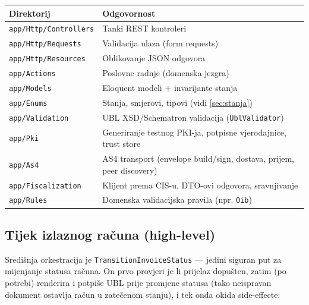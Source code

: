 \documentclass[11pt,a4paper]{article}
\begin{document}
\begin{tabularx}{\textwidth}{@{}lY@{}}
\toprule
\textbf{Direktorij} & \textbf{Odgovornost} \\
\midrule
\texttt{app/Http/Controllers} & Tanki REST kontroleri \\
\texttt{app/Http/Requests} & Validacija ulaza (form requests) \\
\texttt{app/Http/Resources} & Oblikovanje JSON odgovora \\
\texttt{app/Actions} & Poslovne radnje (domenska jezgra) \\
\texttt{app/Models} & Eloquent modeli + invarijante stanja \\
\texttt{app/Enums} & Stanja, smjerovi, tipovi (vidi \ref{sec:stanja}) \\
\texttt{app/Validation} & UBL XSD/Schematron validacija (\texttt{UblValidator}) \\
\texttt{app/Pki} & Generiranje testnog PKI-ja, potpisne vjerodajnice, trust store \\
\texttt{app/As4} & AS4 transport (envelope build/sign, dostava, prijem, peer discovery) \\
\texttt{app/Fiscalization} & Klijent prema CIS-u, DTO-ovi odgovora, sravnjivanje \\
\texttt{app/Rules} & Domenska validacijska pravila (npr. \texttt{Oib}) \\
\bottomrule
\end{tabularx}

\subsection{Tijek izlaznog računa (high-level)}\label{sec:tijek}

Središnja orkestracija je \texttt{TransitionInvoiceStatus} — jedini siguran put za
mijenjanje statusa računa. On prvo provjeri je li prijelaz dopušten, zatim (po potrebi)
renderira i potpiše UBL prije promjene statusa (tako neispravan dokument ostavlja
račun u zatečenom stanju), i tek onda okida side-effecte:
\end{document}
